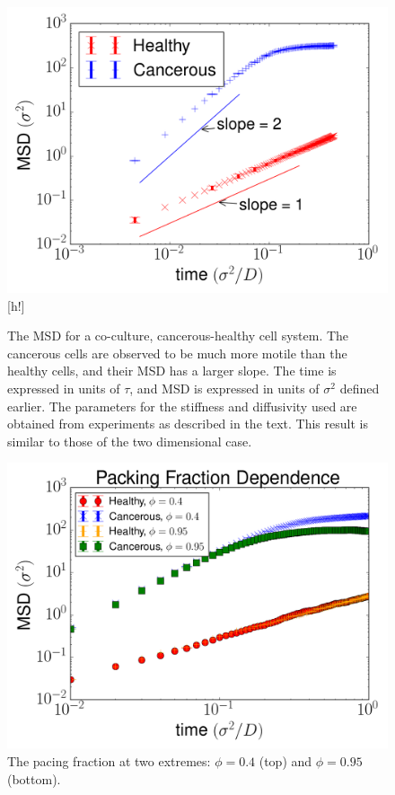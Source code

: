 \documentclass[aps,prb,twocolumn,groupedaddress,nofootinbib,floatfix]{revtex4}
\begin{document}
\begin{figure}
  \includegraphics[width=\columnwidth]{images/cocultureMSD.png}[h!]
  \caption[cocultureMSD]
    {The MSD for a co-culture, cancerous-healthy cell system. The cancerous cells
    are observed to be much more motile than the healthy cells, and their MSD has a larger slope. The time is expressed in units of $\tau$, and MSD is expressed
    in units of $\sigma^2$ defined earlier. The parameters for the stiffness and diffusivity used are obtained from experiments as described in the text.  This result is
    similar to those of the two dimensional case\cite{Butcher}.}
  \label{fig:cocultureMSD}
\end{figure}

\begin{figure}
  \includegraphics[width=1.0\columnwidth]{images/phi_both.png}
  \caption{The pacing fraction at two extremes: $\phi=0.4$ (top) and $\phi=0.95$ (bottom).}
  \label{fig:phi}
\end{figure}
\end{document}
